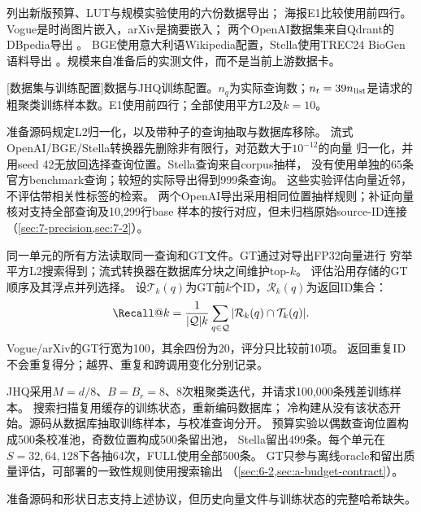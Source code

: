 列出新版预算、LUT与规模实验使用的六份数据导出；
海报E1比较使用前四行。Vogue是时尚图片嵌入，arXiv是摘要嵌入；
两个OpenAI数据集来自Qdrant的DBpedia导出
\cite{data_vogue,data_arxiv,data_openai1536,data_openai3072}。
BGE使用意大利语Wikipedia配置，Stella使用TREC24 BioGen语料导出
\cite{data_bge,data_stella}。规模来自准备后的实测文件，而不是当前上游数据卡。

\par\medskip\noindent\begin{minipage}{\linewidth}
\centering\captionsetup{hypcap=false}
[数据集与训练配置]{数据与JHQ训练配置。$n_q$为实际查询数；$n_t=39n_{\rm list}$是请求的
粗聚类训练样本数。E1使用前四行；全部使用平方L2及$k=10$。}
\label{tab:3-data}
\small\setlength{\tabcolsep}{4pt}

\end{minipage}\par\medskip

准备源码规定L2归一化，以及带种子的查询抽取与数据库移除。
流式OpenAI/BGE/Stella转换器先删除非有限行，对范数大于$10^{-12}$的向量
归一化，并用seed 42无放回选择查询位置。Stella查询来自corpus抽样，
没有使用单独的65条官方benchmark查询；较短的实际导出得到999条查询。
这些实验评估向量近邻，不评估带相关性标签的检索。
两个OpenAI导出采用相同位置抽样规则；补证向量核对支持全部查询及10,299行base
样本的按行对应，但未归档原始source-ID连接（\cref{sec:7-precision,sec:7-2}）。

同一单元的所有方法读取同一查询和GT文件。GT通过对导出FP32向量进行
穷举平方L2搜索得到；流式转换器在数据库分块之间维护top-$k$。
评估沿用存储的GT顺序及其浮点并列选择。
设$\mathcal T_k(q)$为GT前$k$个ID，$\mathcal R_k(q)$为返回ID集合：
\begin{equation}
\Recall@k=\frac{1}{|\mathcal Q|k}
\sum_{q\in\mathcal Q}|\mathcal R_k(q)\cap\mathcal T_k(q)|.
\label{eq:3-recall}
\end{equation}
Vogue/arXiv的GT行宽为100，其余四份为20，评分只比较前10项。
返回重复ID不会重复得分；越界、重复和跨调用变化分别记录。

JHQ采用$M=d/8$、$B=B_r=8$、8次粗聚类迭代，并请求100,000条残差训练样本。
搜索扫描复用缓存的训练状态，重新编码数据库；
冷构建从没有该状态开始。源码从数据库抽取训练样本，与校准查询分开。
预算实验以偶数查询位置构成500条校准池，奇数位置构成500条留出池，
Stella留出499条。每个单元在$S=32,64,128$下各抽64次，FULL使用全部500条。
GT只参与离线oracle和留出质量评估，可部署的一致性规则使用搜索输出
（\cref{sec:6-2,sec:a-budget-contract}）。

准备源码和形状日志支持上述协议，但历史向量文件与训练状态的完整哈希缺失。
